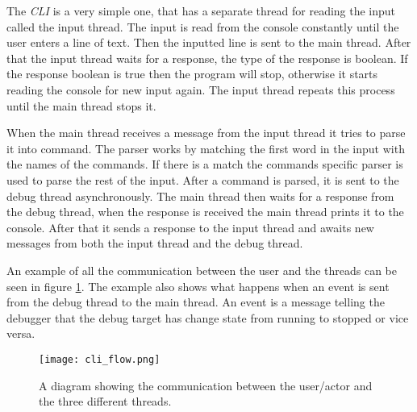 The \emph{CLI} is a very simple one, that has a separate thread for reading the input called the input thread.
The input is read from the console constantly until the user enters a line of text.
Then the inputted line is sent to the main thread.
After that the input thread waits for a response, the type of the response is boolean.
If the response boolean is true then the program will stop, otherwise it starts reading the console for new input again.
The input thread repeats this process until the main thread stops it.


When the main thread receives a message from the input thread it tries to parse it into command.
The parser works by matching the first word in the input with the names of the commands.
If there is a match the commands specific parser is used to parse the rest of the input.
After a command is parsed, it is sent to the debug thread asynchronously.
The main thread then waits for a response from the debug thread, when the response is received the main thread prints it to the console.
After that it sends a response to the input thread and awaits new messages from both the input thread and the debug thread.


An example of all the communication between the user and the threads can be seen in figure \ref{fig:cliflow}.
The example also shows what happens when an event is sent from the debug thread to the main thread.
An event is a message telling the debugger that the debug target has change state from running to stopped or vice versa.


\begin{figure}[h]
	\centering
	\texttt{[image: cli\_flow.png]}
	\caption{A diagram showing the communication between the user/actor and the three different threads.}
	\label{fig:cliflow}
\end{figure}


